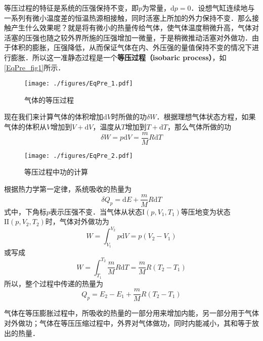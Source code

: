 

等压过程的特征是系统的压强保持不变，即$p $为常量，$\mathrm dp =0$．设想气缸连续地与一系列有微小温度差的恒温热源相接触，同时活塞上所加的外力保持不变．那么接触产生什么效果呢？就是将有微小的热量传给气体，使气体温度稍微升高，气体对活塞的压强也随之较外界所施的压强增加一微量，于是稍微推动活塞对外做功．由于体积的膨胀，压强降低，从而保证气体在内、外压强的量值保持不变的情况下进行膨胀．所以这一准静态过程是一个\textbf{等压过程（isobaric process）}，如\autoref{EqPre_fig1}所示．
\begin{figure}[ht]
\centering
\texttt{[image: ./figures/EqPre\_1.pdf]}
\caption{气体的等压过程} \label{EqPre_fig1}
\end{figure}
现在我们来计算气体的体积增加$\mathrm d V $时所做的功$\delta W$．根据理想气体状态方程，如果气体的体积从$V $增加到$V+\mathrm dV$，温度从$T $增加到$T+\mathrm dT$，那么气体所做的功
\begin{equation}
\delta W=p \mathrm{d} V=\frac{m}{M} R \mathrm{d} T
\end{equation}
\begin{figure}[ht]
\centering
\texttt{[image: ./figures/EqPre\_2.pdf]}
\caption{等压过程中功的计算} \label{EqPre_fig2}
\end{figure}
根据热力学第一定律，系统吸收的热量为
\begin{equation}
\delta Q_{p}=\mathrm{d} E+\frac{m}{M} R \mathrm{d} T
\end{equation}
式中，下角标$p $表示压强不变．当气体从状态$\mathrm I(p, V_1, T_1)$等压地变为状态$\mathrm{II}(p, V_2,T_2)$时，气体对外做功为
\begin{equation}
W=\int_{V_{1}}^{V_{2}} p \mathrm{d} V=p\left(V_{2}-V_{1}\right)
\end{equation}
或写成
\begin{equation}
W=\int_{T_{1}}^{T_{2}} \frac{m}{M} R \mathrm{d} T=\frac{m}{M} R\left(T_{2}-T_{1}\right)
\end{equation}
所以，整个过程中传递的热量为
\begin{equation}
Q_{p}=E_{2}-E_{1}+\frac{m}{M} R\left(T_{2}-T_{1}\right)
\end{equation}

气体在等压膨胀过程中，所吸收的热量的一部分用来增加内能，另一部分用于气体对外做功；气体在等压压缩过程中，外界对气体做功，同时内能减小，其和等于放出的热量．

